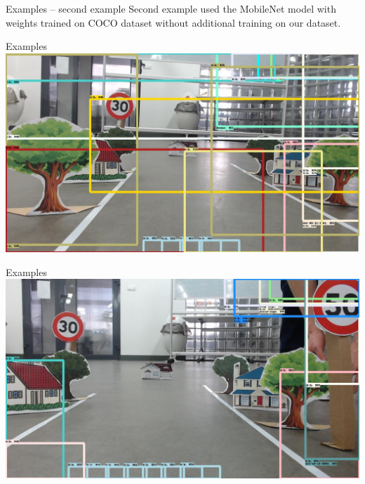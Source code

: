 \documentclass[aspectratio=1610,english]{beamer} %
\begin{document}
  	\begin{frame}{Examples -- second example}
		Second example used the MobileNet model with weights trained on COCO dataset without additional training on our dataset.
	\end{frame}
  	\begin{frame}{Examples}
		\includegraphics[scale=0.3]{examples/no_retraining_of_stock_model/session_one-6.jpg}
	\end{frame}
  	\begin{frame}{Examples}
		\includegraphics[scale=0.3]{examples/no_retraining_of_stock_model/session_one-10.jpg}
	\end{frame}
	
\end{document}
